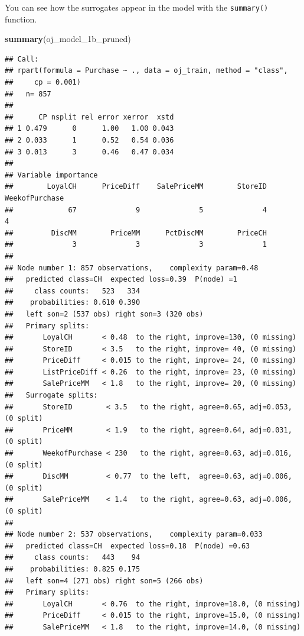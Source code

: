 \documentclass[
]{book}
\newenvironment{Shaded}{\begin{snugshade}}{\end{snugshade}}
\newcommand{\KeywordTok}[1]{\textcolor[rgb]{0.13,0.29,0.53}{\textbf{#1}}}
\newcommand{\NormalTok}[1]{#1}
\begin{document}
You can see how the surrogates appear in the model with the \texttt{summary()} function.

\begin{Shaded}
\begin{Highlighting}[]
\KeywordTok{summary}\NormalTok{(oj_model_1b_pruned)}
\end{Highlighting}
\end{Shaded}

\begin{verbatim}
## Call:
## rpart(formula = Purchase ~ ., data = oj_train, method = "class", 
##     cp = 0.001)
##   n= 857 
## 
##      CP nsplit rel error xerror  xstd
## 1 0.479      0      1.00   1.00 0.043
## 2 0.033      1      0.52   0.54 0.036
## 3 0.013      3      0.46   0.47 0.034
## 
## Variable importance
##        LoyalCH      PriceDiff    SalePriceMM        StoreID WeekofPurchase 
##             67              9              5              4              4 
##         DiscMM        PriceMM      PctDiscMM        PriceCH 
##              3              3              3              1 
## 
## Node number 1: 857 observations,    complexity param=0.48
##   predicted class=CH  expected loss=0.39  P(node) =1
##     class counts:   523   334
##    probabilities: 0.610 0.390 
##   left son=2 (537 obs) right son=3 (320 obs)
##   Primary splits:
##       LoyalCH       < 0.48  to the right, improve=130, (0 missing)
##       StoreID       < 3.5   to the right, improve= 40, (0 missing)
##       PriceDiff     < 0.015 to the right, improve= 24, (0 missing)
##       ListPriceDiff < 0.26  to the right, improve= 23, (0 missing)
##       SalePriceMM   < 1.8   to the right, improve= 20, (0 missing)
##   Surrogate splits:
##       StoreID        < 3.5   to the right, agree=0.65, adj=0.053, (0 split)
##       PriceMM        < 1.9   to the right, agree=0.64, adj=0.031, (0 split)
##       WeekofPurchase < 230   to the right, agree=0.63, adj=0.016, (0 split)
##       DiscMM         < 0.77  to the left,  agree=0.63, adj=0.006, (0 split)
##       SalePriceMM    < 1.4   to the right, agree=0.63, adj=0.006, (0 split)
## 
## Node number 2: 537 observations,    complexity param=0.033
##   predicted class=CH  expected loss=0.18  P(node) =0.63
##     class counts:   443    94
##    probabilities: 0.825 0.175 
##   left son=4 (271 obs) right son=5 (266 obs)
##   Primary splits:
##       LoyalCH       < 0.76  to the right, improve=18.0, (0 missing)
##       PriceDiff     < 0.015 to the right, improve=15.0, (0 missing)
##       SalePriceMM   < 1.8   to the right, improve=14.0, (0 missing)

\end{verbatim}
\end{document}
